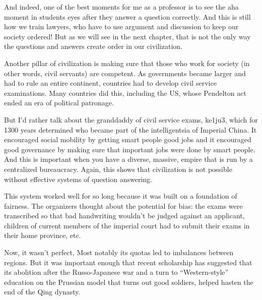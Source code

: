 And indeed, one of the best moments for me as a professor is to see the aha moment in students eyes after they answer a question correctly.  And this is still how we train lawyers, who have to use argument and discussion to keep our society ordered!  But as we will see in the next chapter, that is not the only way the questions and answers create order in our civilization.





Another pillar of civilization is making sure that those who work for society (in other words, civil servants) are competent.  As governments became larger and had to rule an entire continent, countries had to develop civil service examinations.  Many countries did this, including the US, whose Pendelton act ended an era of political patronage. 

But I’d rather talk about the granddaddy of civil service exams, ke1ju3, which for 1300 years determined who became part of the intelligentsia of Imperial China.   
It encouraged social mobility by getting smart people good jobs and it encouraged good governance by making sure that important jobs were done by smart people.  And this is important when you have a diverse, massive, empire that is run by a centralized bureaucracy.  Again, this shows that civilization is not possible without effective systems of question answering.

This system worked well for so long because it was built on a foundation of fairness.  The organizers thought about the potential for bias: the exams were transcribed so that bad handwriting wouldn’t be judged against an applicant, children of current members of the imperial court had to submit their exams in their home province, etc.  

Now, it wasn’t perfect, Most notably its quotas led to imbalances between regions.  But it was important enough that recent scholarship has suggested that its abolition after the Russo-Japanese war and a turn to ``Western-style'' education on the Prussian model that turns out good soldiers, helped hasten the end of the Q\-ing dynasty.

